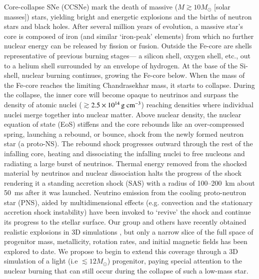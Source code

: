Core-collapse SNe (CCSNe) mark the death of massive ($M \gtrsim 10
M_{\odot}$ [solar masses]) stars, yielding bright and energetic
explosions and the births of neutron stars and black holes.  After
several million years of evolution, a massive star's core is composed
of iron (and similar `iron-peak' elements) from which no further
nuclear energy can be released by fission or fusion.  Outside the
Fe-core are shells representative of previous burning stages--- a
silicon shell, oxygen shell, etc., out to a helium shell surrounded by
an envelope of hydrogen.  At the base of the Si-shell, nuclear burning
continues, growing the Fe-core below.  When the mass of the Fe-core
reaches the limiting Chandrasekhar mass, it starts to collapse.
During the collapse, the inner core will become opaque to neutrinos
and surpass the density of atomic nuclei
($\gtrsim$$2.5\times10^{14}\,{\mathrm{g~cm^{-3}}}$) reaching densities where
individual nuclei merge together into nuclear matter.  Above nuclear
density, the nuclear equation of state (EoS) stiffens and the core
rebounds like an over-compressed spring, launching a rebound, or
bounce, shock from the newly formed neutron star (a proto-NS).  The
rebound shock progresses outward through the rest of the infalling
core, heating and dissociating the infalling nuclei to free nucleons
and radiating a large burst of neutrinos. Thermal energy removed from
the shocked material by neutrinos and nuclear dissociation halts the
progress of the shock rendering it a standing accretion shock (SAS)
with a radius of 100--200~km about 50~ms after it was
launched. Neutrino emission from the cooling proto-neutron star (PNS),
aided by multidimensional effects (e.g. convection and the stationary
accretion shock instability) have been invoked to `revive' the shock
and continue its progress to the stellar surface.  Our group and
others have recently obtained realistic explosions in
3D simulations \cite{lentzetal2015,melson}, but only a
narrow slice of the full space of progenitor mass, metallicity,
rotation rates, and initial magnetic fields has been explored to
date. We propose to begin to extend this coverage through a 3D
simulation of a light (i.e $\lesssim 12 M_{\odot}$) progenitor, paying
special attention to the nuclear burning that can still occur during
the collapse of such a low-mass star.
